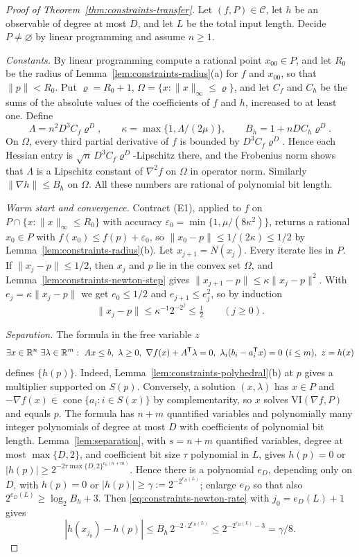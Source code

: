 \begin{proof}[Proof of Theorem~\ref{thm:constraints-transfer}]
Let $(f,P)\in\mathcal C$, let $h$ be an observable of degree at most $D$, and
let $L$ be the total input length. Decide $P\ne\varnothing$ by linear
programming and assume $n\ge1$.

\emph{Constants.} By linear programming compute a rational point
$x_{00}\in P$, and let $R_0$ be the radius of
Lemma~\ref{lem:constraints-radius}(a) for $f$ and $x_{00}$, so that
$\|p\|<R_0$. Put $\varrho=R_0+1$,
$\Omega=\{x:\|x\|_\infty\le\varrho\}$, and let $C_f$ and $C_h$ be the sums of
the absolute values of the coefficients of $f$ and $h$, increased to at least
one. Define
\[
 \Lambda=n^2D^3C_f\varrho^D,\qquad \kappa=\max\{1,\Lambda/(2\mu)\},\qquad
 B_h=1+nDC_h\varrho^D .
\]
On $\Omega$, every third partial derivative of $f$ is bounded by
$D^3C_f\varrho^D$. Hence each Hessian entry is
$\sqrt n\,D^3C_f\varrho^D$-Lipschitz there, and the Frobenius norm shows that
$\Lambda$ is a Lipschitz constant of $\nabla^2f$ on $\Omega$ in operator norm.
Similarly $\|\nabla h\|\le B_h$ on $\Omega$. All these numbers are rational
of polynomial bit length.

\emph{Warm start and convergence.} Contract (E1), applied to $f$ on
$P\cap\{x:\|x\|_\infty\le R_0\}$ with accuracy
$\varepsilon_0=\min\{1,\mu/(8\kappa^2)\}$, returns a rational $x_0\in P$ with
$f(x_0)\le f(p)+\varepsilon_0$, so $\|x_0-p\|\le1/(2\kappa)\le1/2$ by
Lemma~\ref{lem:constraints-radius}(b). Let $x_{j+1}=N(x_j)$. Every iterate
lies in $P$. If $\|x_j-p\|\le1/2$, then $x_j$ and $p$ lie in the convex set
$\Omega$, and Lemma~\ref{lem:constraints-newton-step} gives
$\|x_{j+1}-p\|\le\kappa\|x_j-p\|^2$. With $e_j=\kappa\|x_j-p\|$ we get
$e_0\le1/2$ and $e_{j+1}\le e_j^2$, so by induction
\begin{equation}\label{eq:constraints-newton-rate}
 \|x_j-p\|\le\kappa^{-1}2^{-2^j}\le\tfrac12\qquad(j\ge0).
\end{equation}

\emph{Separation.} The formula in the free variable $z$
\[
 \exists x\in\mathbb R^n\ \exists\lambda\in\mathbb R^m:\
 Ax\le b,\ \lambda\ge0,\ \nabla f(x)+A^{\mathsf T}\lambda=0,\
 \lambda_i(b_i-a_i^{\mathsf T}x)=0\ (i\le m),\ z=h(x)
\]
defines $\{h(p)\}$. Indeed, Lemma~\ref{lem:constraints-polyhedral}(b) at $p$
gives a multiplier supported on $S(p)$. Conversely, a solution $(x,\lambda)$
has $x\in P$ and $-\nabla f(x)\in\operatorname{cone}\{a_i:i\in S(x)\}$ by
complementarity, so $x$ solves $\mathrm{VI}(\nabla f,P)$ and equals $p$. The
formula has $n+m$ quantified variables and polynomially many integer
polynomials of degree at most $D$ with coefficients of polynomial bit length.
Lemma~\ref{lem:separation}, with $s=n+m$ quantified variables, degree at
most $\max\{D,2\}$, and coefficient bit size $\tau$ polynomial in $L$, gives
$h(p)=0$ or $|h(p)|\ge2^{-2\tau\max\{D,2\}^{c_0(n+m)}}$. Hence there is a
polynomial $e_D$, depending only on $D$, with $h(p)=0$ or
$|h(p)|\ge\gamma:=2^{-2^{e_D(L)}}$; enlarge $e_D$ so that also
$2^{e_D(L)}\ge\log_2B_h+3$. Then \eqref{eq:constraints-newton-rate} with
$j_0=e_D(L)+1$ gives
\[
 |h(x_{j_0})-h(p)|\le B_h\,2^{-2\cdot2^{e_D(L)}}\le2^{-2^{e_D(L)}-3}=\gamma/8 .
\]


\end{proof}
